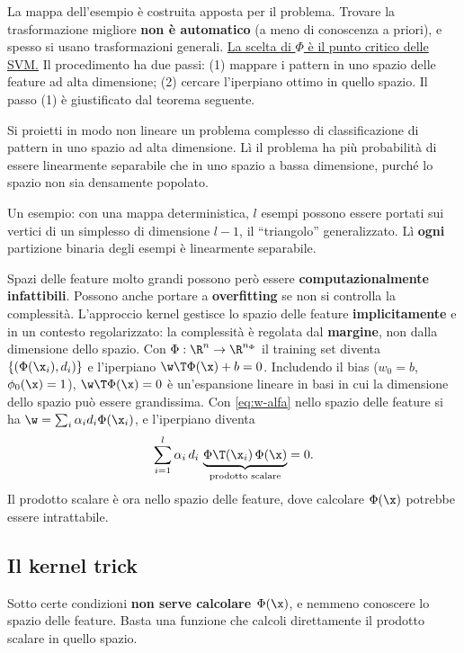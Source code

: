 La mappa dell'esempio è costruita apposta per il problema. Trovare la trasformazione migliore \textbf{non è
automatico} (a meno di conoscenza a priori), e spesso si usano trasformazioni generali. \uline{La scelta di $\Phi$ è
il punto critico delle SVM.} Il procedimento ha due passi: (1) mappare i pattern in uno spazio delle feature ad
alta dimensione; (2) cercare l'iperpiano ottimo in quello spazio. Il passo (1) è giustificato dal teorema
seguente.

\begin{teorema}[Cover]
Si proietti in modo non lineare un problema complesso di classificazione di pattern in uno spazio ad alta
dimensione. Lì il problema ha più probabilità di essere linearmente separabile che in uno spazio a bassa
dimensione, purché lo spazio non sia densamente popolato.
\end{teorema}

Un esempio: con una mappa deterministica, $l$ esempi possono essere portati sui vertici di un simplesso di
dimensione $l-1$, il ``triangolo'' generalizzato. Lì \textbf{ogni} partizione binaria degli esempi è linearmente
separabile.

Spazi delle feature molto grandi possono però essere \textbf{computazionalmente infattibili}. Possono anche portare
a \textbf{overfitting} se non si controlla la complessità. L'approccio kernel gestisce lo spazio delle feature
\textbf{implicitamente} e in un contesto regolarizzato: la complessità è regolata dal \textbf{margine}, non dalla
dimensione dello spazio. Con $\Phi:\R^{n}\to\R^{n_\Phi}$ il training set diventa $\{(\Phi(\x_i),d_i)\}$ e
l'iperpiano $\w\T\Phi(\x)+b=0$. Includendo il bias ($w_0=b$, $\phi_0(\x)=1$), $\w\T\Phi(\x)=0$ è un'espansione
lineare in basi in cui la dimensione dello spazio può essere grandissima. Con \eqref{eq:w-alfa} nello spazio delle
feature si ha $\w = \sum_i\alpha_id_i\Phi(\x_i)$, e l'iperpiano diventa
\[
\sum_{i=1}^{l}\alpha_i\,d_i\,\underbrace{\Phi\T(\x_i)\,\Phi(\x)}_{\text{prodotto scalare}} = 0 .
\]
Il prodotto scalare è ora nello spazio delle feature, dove calcolare $\Phi(\x)$ potrebbe essere intrattabile.

\subsection{Il kernel trick}

Sotto certe condizioni \textbf{non serve calcolare $\Phi(\x)$}, e nemmeno conoscere lo spazio delle feature. Basta
una funzione che calcoli direttamente il prodotto scalare in quello spazio.

